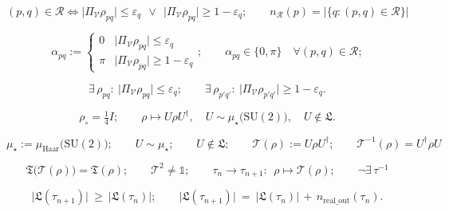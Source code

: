 \begin{axiom}[{\texorpdfstring{A4}{A4}}]\label{tag:A4}
\[
(p,q)\in\mathcal R\iff\bigl|\Pi_{\mathcal V}\rho_{pq}\bigr|\le\varepsilon_q\ \ \vee\ \ \bigl|\Pi_{\mathcal V}\rho_{pq}\bigr|\ge1-\varepsilon_q;\qquad
n_{\mathcal R}(p)=\bigl|\{q:(p,q)\in\mathcal R\}\bigr|
\]

\[
\alpha_{pq}:=\begin{cases}0&\bigl|\Pi_{\mathcal V}\rho_{pq}\bigr|\le\varepsilon_q\\[1mm] \pi&\bigl|\Pi_{\mathcal V}\rho_{pq}\bigr|\ge1-\varepsilon_q\end{cases};\qquad
\alpha_{pq}\in\{0,\pi\}\quad\forall(p,q)\in\mathcal R;
\]

\[
\exists\,\rho_{pq}:\ \bigl|\Pi_{\mathcal V}\rho_{pq}\bigr|\le\varepsilon_q;\qquad
\exists\,\rho_{p'q'}:\ \bigl|\Pi_{\mathcal V}\rho_{p'q'}\bigr|\ge1-\varepsilon_q .
\]

\end{axiom}

\begin{axiom}[{\texorpdfstring{A5}{A5}}]\label{tag:A5}
\[
\rho_\circ=\tfrac14 I;\qquad
\rho\mapsto U\rho U^\dagger,\quad U\sim\mu_\star\bigl(\mathrm{SU}(2)\bigr),\quad U\notin\mathfrak L .
\]

\end{axiom}

\begin{axiom}[{\texorpdfstring{A6}{A6}}]\label{tag:A6}
\[
\mu_\star:=\mu_{\mathrm{Haar}}\bigl(\mathrm{SU}(2)\bigr);\qquad
U\sim\mu_\star;\qquad
U\notin\mathfrak L;\qquad
\mathcal T(\rho):=U\rho U^\dagger;\qquad
\mathcal T^{-1}(\rho)=U^\dagger\rho U
\]

\[
\mathfrak T\bigl(\mathcal T(\rho)\bigr)=\mathfrak T(\rho);\qquad
\mathcal T^{2}\ne\mathbb1;\qquad
\tau_n\to\tau_{n+1}:\ \ \rho\mapsto\mathcal T(\rho);\qquad
\neg\exists\,\tau^{-1}
\]

\[
\bigl|\mathfrak L(\tau_{n+1})\bigr|\ \ge\ \bigl|\mathfrak L(\tau_n)\bigr|;\qquad
\bigl|\mathfrak L(\tau_{n+1})\bigr|\ =\ \bigl|\mathfrak L(\tau_n)\bigr|\,+\,n_{\mathrm{real\_out}}(\tau_n) .
\]

\end{axiom}


